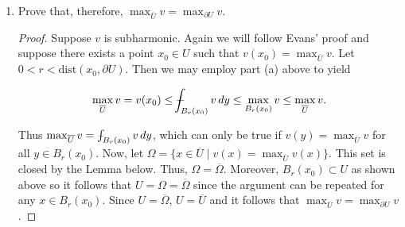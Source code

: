 \documentclass[11pt,oneside,english]{amsart}
\theoremstyle{definition}
\newcommand{\pspace}{\hspace{10mm}}
\newcommand{\dd}[2]{\frac{d{#1}}{d{#2}}}
\newcommand{\pp}[2]{\frac{\partial{#1}}{\partial{#2}}}
\def\Xint#1{\mathchoice
{\XXint\displaystyle\textstyle{#1}}%
{\XXint\textstyle\scriptstyle{#1}}%
{\XXint\scriptstyle\scriptscriptstyle{#1}}%
{\XXint\scriptscriptstyle\scriptscriptstyle{#1}}%
\!\int}
\def\XXint#1#2#3{{\setbox0=\hbox{$#1{#2#3}{\int}$ }
\vcenter{\hbox{$#2#3$ }}\kern-.6\wd0}}
\def\dashint{\Xint-}
\begin{document}
\begin{enumerate}
\begin{enumerate}
\begin{proof}
\[
\phi(r):=\dashint_{\partial B_1(0)}v(x+rz)\,dS_z\pspace\text{where }y=x+rz,\text{ and so }z=\frac{y-x}{r}.
\]

\vspace{-0.5cm}
Differentiating this with respect to $r$ and applying the Divergence theorem, we find

\begin{align*}
\dd{\phi}{r}&=\dd{}{r}\dashint_{\partial B_1(0)}v(x+rz)\,dS_z\\[2mm]
&=\dashint_{\partial B_1(0)}Dv(x+rz)\cdot z\,dS_z\\[2mm]
&=\dashint_{\partial B_1(0)}Dv(x+rz)\cdot \frac{y-x}{r}\,dS_z\\[2mm]
&=\dashint_{\partial B_1(0)}Dv\cdot \mathbf{n}\,dS_z\\[2mm]
&=\dashint_{\partial B_1(0)}\pp{v}{\mathbf{n}}\,dS_z\\[2mm]
&=\dashint_{B_1(0)}\Delta v(x+rz)\,dz\\[2mm]
&=\frac{r}{n}\dashint_{B_r(x)}\Delta(y)\,dy\geq0.\\[2mm]
\end{align*}

Thus, the mean value of $v$ over the surface of any sphere inside $U$ is increasing as $r$ increases. We also know that when $r=0$, $\phi(r)=v(x)$, therefore

\[
\dashint_{B_r(x)} v\,dy\geq v(x)
\]

as required.
\end{proof}

\item Prove that, therefore, $\displaystyle \max_{\overline{U}}v=\max_{\partial U}v$.

\begin{proof}
Suppose $v$ is subharmonic. Again we will follow Evans' proof and suppose there exists a point $x_0\in U$ such that $v(x_0)=\max_{\overline{U}}v$. Let $0<r<\text{dist}(x_0,\partial U)$. Then we may employ part (a) above to yield

\[
\max_{\overline{U}}v=v(x_0)\leq \dashint_{B_r(x_0)} v\,dy\leq \max_{B_r(x_0)}v\leq\max_{\overline{U}}v.
\]

Thus $\max_{\overline{U}}v= \dashint_{B_r(x_0)} v\,dy$, which can only be true if $v(y)=\max_{\overline{U}}v$ for all $y\in B_r(x_0)$. Now, let $\Omega=\{x\in \overline{U}\mid v(x)=\max_{\overline{U}}v(x)\}$. This set is closed by the Lemma below. Thus, $\Omega=\overline{\Omega}$. Moreover, $B_r(x_0)\subset U$ as shown above so it follows that $U=\Omega=\overline{\Omega}$ since the argument can be repeated for any $x\in B_r(x_0)$. Since $U=\overline{\Omega}$, $U=\overline{U}$ and it follows that $\displaystyle \max_{\overline{U}}v=\max_{\partial U}v$.
\end{proof}


\end{enumerate}
\end{enumerate}
\end{document}
